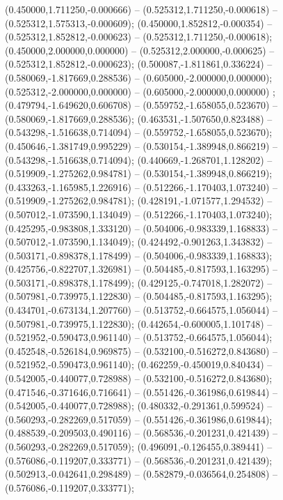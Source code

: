  (0.450000,1.711250,-0.000666) -- (0.525312,1.711250,-0.000618) -- (0.525312,1.575313,-0.000609);
 (0.450000,1.852812,-0.000354) -- (0.525312,1.852812,-0.000623) -- (0.525312,1.711250,-0.000618);
 (0.450000,2.000000,0.000000) -- (0.525312,2.000000,-0.000625) -- (0.525312,1.852812,-0.000623);
 (0.500087,-1.811861,0.336224) -- (0.580069,-1.817669,0.288536) -- (0.605000,-2.000000,0.000000);
 (0.525312,-2.000000,0.000000) -- (0.605000,-2.000000,0.000000) ;
 (0.479794,-1.649620,0.606708) -- (0.559752,-1.658055,0.523670) -- (0.580069,-1.817669,0.288536);
 (0.463531,-1.507650,0.823488) -- (0.543298,-1.516638,0.714094) -- (0.559752,-1.658055,0.523670);
 (0.450646,-1.381749,0.995229) -- (0.530154,-1.389948,0.866219) -- (0.543298,-1.516638,0.714094);
 (0.440669,-1.268701,1.128202) -- (0.519909,-1.275262,0.984781) -- (0.530154,-1.389948,0.866219);
 (0.433263,-1.165985,1.226916) -- (0.512266,-1.170403,1.073240) -- (0.519909,-1.275262,0.984781);
 (0.428191,-1.071577,1.294532) -- (0.507012,-1.073590,1.134049) -- (0.512266,-1.170403,1.073240);
 (0.425295,-0.983808,1.333120) -- (0.504006,-0.983339,1.168833) -- (0.507012,-1.073590,1.134049);
 (0.424492,-0.901263,1.343832) -- (0.503171,-0.898378,1.178499) -- (0.504006,-0.983339,1.168833);
 (0.425756,-0.822707,1.326981) -- (0.504485,-0.817593,1.163295) -- (0.503171,-0.898378,1.178499);
 (0.429125,-0.747018,1.282072) -- (0.507981,-0.739975,1.122830) -- (0.504485,-0.817593,1.163295);
 (0.434701,-0.673134,1.207760) -- (0.513752,-0.664575,1.056044) -- (0.507981,-0.739975,1.122830);
 (0.442654,-0.600005,1.101748) -- (0.521952,-0.590473,0.961140) -- (0.513752,-0.664575,1.056044);
 (0.452548,-0.526184,0.969875) -- (0.532100,-0.516272,0.843680) -- (0.521952,-0.590473,0.961140);
 (0.462259,-0.450019,0.840434) -- (0.542005,-0.440077,0.728988) -- (0.532100,-0.516272,0.843680);
 (0.471546,-0.371646,0.716641) -- (0.551426,-0.361986,0.619844) -- (0.542005,-0.440077,0.728988);
 (0.480332,-0.291361,0.599524) -- (0.560293,-0.282269,0.517059) -- (0.551426,-0.361986,0.619844);
 (0.488539,-0.209503,0.490116) -- (0.568536,-0.201231,0.421439) -- (0.560293,-0.282269,0.517059);
 (0.496091,-0.126455,0.389441) -- (0.576086,-0.119207,0.333771) -- (0.568536,-0.201231,0.421439);
 (0.502913,-0.042641,0.298489) -- (0.582879,-0.036564,0.254808) -- (0.576086,-0.119207,0.333771);
